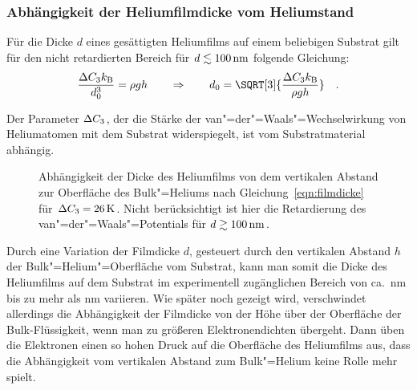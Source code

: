 \subsubsection{Abhängigkeit der Heliumfilmdicke vom Heliumstand}

Für die Dicke $d$ eines gesättigten Heliumfilms auf einem beliebigen Substrat gilt für den nicht retardierten Bereich für $d\lesssim\unit[100]{nm}$ folgende Gleichung:
    \begin{equation}
        \label{eqn:filmdicke}
        \frac{\DC k_\text{B}}{d_0^3}=\rho g h
            \qquad\Rightarrow\qquad
            d_0=\SQRT[3]{\frac{\DC\kB}{\rho g h}}\quad.
    \end{equation}

Der Parameter $\Delta C_3$, der die Stärke der van"=der"=Waals"=Wechselwirkung von Heliumatomen mit dem Substrat widerspiegelt, ist vom Substratmaterial abhängig.  
\begin{figure}[h!tbp]
    \begin{center}
         \quad
    \end{center}
    \caption[Filmdicke des Heliumfilms über der Bulk"=Flüssigkeit]{Abhängigkeit der Dicke des Heliumfilms von dem vertikalen Abstand zur Oberfläche des Bulk"=Heliums nach Gleichung~\eqref{eqn:filmdicke} für $\DC=\unit[26]{K}$. Nicht berücksichtigt ist hier die Retardierung des van"=der"=Waals"=Potentials für $d\gtrsim\unit[100]{nm}$.}
\end{figure}

Durch eine Variation der Filmdicke $d$, gesteuert durch den vertikalen Abstand $h$ der Bulk"=Helium"=Oberfläche vom Substrat, kann man somit die Dicke des Heliumfilms auf dem Substrat im experimentell zugänglichen Bereich von ca.\ \unit[25]{nm} bis zu mehr als \unit[90]{nm} variieren. Wie später noch gezeigt wird, verschwindet allerdings die Abhängigkeit der Filmdicke von der Höhe über der Oberfläche der Bulk-Flüssigkeit, wenn man zu größeren Elektronendichten übergeht. Dann üben die Elektronen einen so hohen Druck auf die Oberfläche des Heliumfilms aus, dass die Abhängigkeit vom vertikalen Abstand zum Bulk"=Helium keine Rolle mehr spielt.

